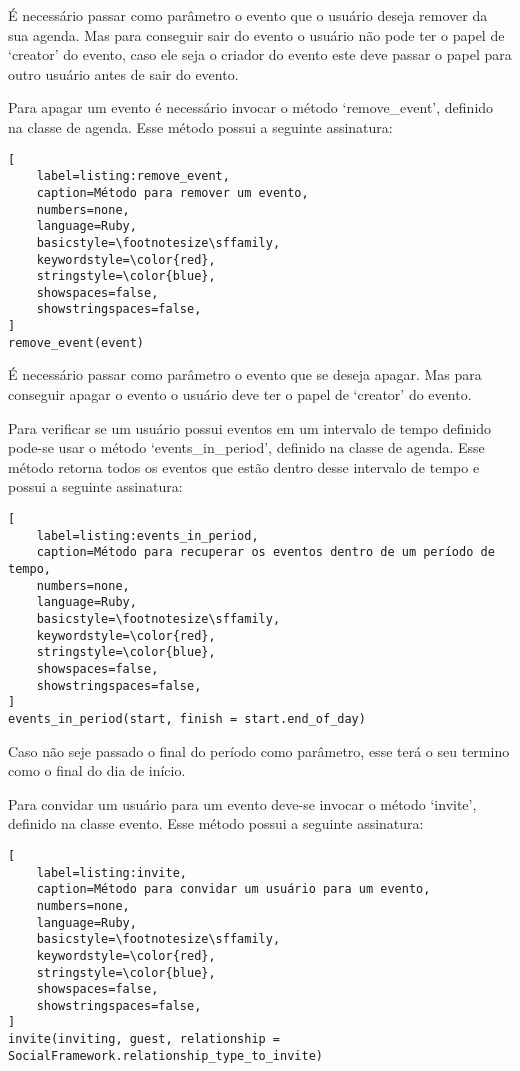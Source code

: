É necessário passar como parâmetro o evento que o usuário deseja remover da sua agenda. Mas para conseguir sair do evento o usuário não pode ter o papel de `creator' do evento, caso ele seja o criador do evento este deve passar o papel para outro usuário antes de sair do evento.

Para apagar um evento é necessário invocar o método `remove\_event', definido na classe de agenda. Esse método possui a seguinte assinatura:

\begin{lstlisting}[
    label=listing:remove_event,
    caption=Método para remover um evento,
    numbers=none,
    language=Ruby,
    basicstyle=\footnotesize\sffamily,
    keywordstyle=\color{red},
    stringstyle=\color{blue},
    showspaces=false,
    showstringspaces=false,
]
remove_event(event)
\end{lstlisting}

É necessário passar como parâmetro o evento que se deseja apagar. Mas para conseguir apagar o evento o usuário deve ter o papel de `creator' do evento.

Para verificar se um usuário possui eventos em um intervalo de tempo definido pode-se usar o método `events\_in\_period', definido na classe de agenda. Esse método retorna todos os eventos que estão dentro desse intervalo de tempo e possui a seguinte assinatura:

\begin{lstlisting}[
    label=listing:events_in_period,
    caption=Método para recuperar os eventos dentro de um período de tempo,
    numbers=none,
    language=Ruby,
    basicstyle=\footnotesize\sffamily,
    keywordstyle=\color{red},
    stringstyle=\color{blue},
    showspaces=false,
    showstringspaces=false,
]
events_in_period(start, finish = start.end_of_day)
\end{lstlisting}

Caso não seje passado o final do período como parâmetro, esse terá o seu termino como o final do dia de início.

Para convidar um usuário para um evento deve-se invocar o método `invite', definido na classe evento. Esse método possui a seguinte assinatura:

\begin{lstlisting}[
    label=listing:invite,
    caption=Método para convidar um usuário para um evento,
    numbers=none,
    language=Ruby,
    basicstyle=\footnotesize\sffamily,
    keywordstyle=\color{red},
    stringstyle=\color{blue},
    showspaces=false,
    showstringspaces=false,
]
invite(inviting, guest, relationship = SocialFramework.relationship_type_to_invite)
\end{lstlisting}

